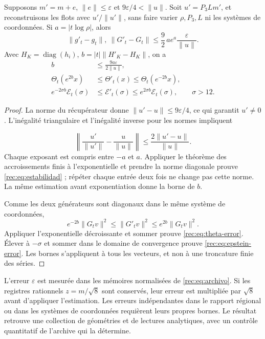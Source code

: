 \begin{theorem}
\label{rec:thm:estabilidad}
Supposons \(m'=m+e\), \(\|e\|\le\varepsilon\) et \(9\varepsilon/4<\|u\|\). Soit \(u'=P_3Lm'\), et reconstruisons les flots avec \(u'/\|u'\|\), sans faire varier \(\rho,P_3,L\) ni les systèmes de coordonnées. Si \(a=|t\log\rho|\), alors
\begin{equation}
 \|g'_t-g_t\|,\ \|G'_t-G_t\|
 \le\frac92\,a e^a\frac{\varepsilon}{\|u\|}.
 \label{rec:eq:estabilidad}
\end{equation}
Avec \(H_K=\operatorname{diag}(h_i)\), \(b=|t|\|H'_K-H_K\|\), on a
\begin{align}
 b&\le\frac{9a\varepsilon}{2\|u\|},\nonumber\\
 \Theta_t(e^{2b}x)&\le\Theta'_t(x)\le\Theta_t(e^{-2b}x),\label{rec:eq:theta-error}\\
 e^{-2\sigma b}\mathcal E_t(\sigma)&\le\mathcal E'_t(\sigma)
             \le e^{2\sigma b}\mathcal E_t(\sigma),\qquad\sigma>12.
 \label{rec:eq:epstein-error}
\end{align}
\end{theorem}
\begin{proof}
La norme du récupérateur donne \(\|u'-u\|\le9\varepsilon/4\), ce qui garantit \(u'\ne0\). L’inégalité triangulaire et l’inégalité inverse pour les normes impliquent

\[
 \left\|\frac{u'}{\|u'\|}-\frac{u}{\|u\|}\right\|
 \le\frac{2\|u'-u\|}{\|u\|}.
\]
Chaque exposant est compris entre \(-a\) et \(a\). Appliquer le théorème des accroissements finis à l'exponentielle et prendre la norme diagonale prouve \eqref{rec:eq:estabilidad} ; répéter chaque entrée deux fois ne change pas cette norme. La même estimation avant exponentiation donne la borne de \(b\).

Comme les deux générateurs sont diagonaux dans le même système de coordonnées,
\[
 e^{-2b}\|G_tv\|^2\le\|G'_tv\|^2\le e^{2b}\|G_tv\|^2.
\]
Appliquer l’exponentielle décroissante et sommer prouve \eqref{rec:eq:theta-error}. Élever à \(-\sigma\) et sommer dans le domaine de convergence prouve \eqref{rec:eq:epstein-error}. Les bornes s’appliquent à tous les vecteurs, et non à une troncature finie des séries.
\end{proof}

L’erreur \(\varepsilon\) est mesurée dans les mémoires normalisées de \eqref{rec:eq:archivo}. Si les registres rationnels \(z=m/\sqrt8\) sont conservés, leur erreur est multipliée par \(\sqrt8\) avant d’appliquer l’estimation. Les erreurs indépendantes dans le rapport régional ou dans les systèmes de coordonnées requièrent leurs propres bornes. Le résultat retrouve une collection de géométries et de lectures analytiques, avec un contrôle quantitatif de l’archive qui la détermine.
